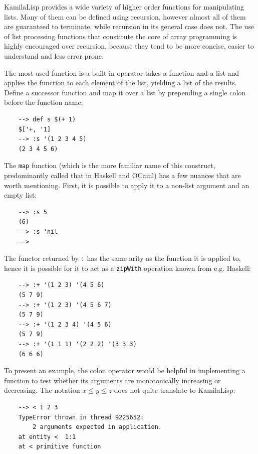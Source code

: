 KamilaLisp provides a wide variety of higher order functions for manipulating lists. Many of them can be defined using recursion, however almost all of them are guaranteed to terminate, while recursion in its general case does not. The use of list processing functions that constitute the core of array programming is highly encouraged over recursion, because they tend to be more concise, easier to understand and less error prone.

The most used function is a built-in operator takes a function and a list and applies the function to each element of the list, yielding a list of the results. Define a successor function and map it over a list by prepending a single colon before the function name:

\begin{Verbatim}
    --> def s $(+ 1)
    $['+, '1]
    --> :s '(1 2 3 4 5)
    (2 3 4 5 6)
\end{Verbatim}

The \verb|map| function (which is the more familiar name of this construct, predominantly called that in Haskell and OCaml) has a few nuances that are worth mentioning. First, it is possible to apply it to a non-list argument and an empty list:

\begin{Verbatim}
    --> :s 5
    (6)
    --> :s 'nil
    -->
\end{Verbatim}

The functor returned by \verb|:| has the same arity as the function it is applied to, hence it is possible for it to act as a \verb|zipWith| operation known from e.g. Haskell:

\begin{Verbatim}
    --> :+ '(1 2 3) '(4 5 6)
    (5 7 9)
    --> :+ '(1 2 3) '(4 5 6 7)
    (5 7 9)
    --> :+ '(1 2 3 4) '(4 5 6)
    (5 7 9)
    --> :+ '(1 1 1) '(2 2 2) '(3 3 3)
    (6 6 6)
\end{Verbatim}

To present an example, the colon operator would be helpful in implementing a function to test whether its arguments are monotonically increasing or decreasing. The notation $x \le y \le z$ does not quite translate to KamilaLisp:

\begin{Verbatim}
    --> < 1 2 3
    TypeError thrown in thread 9225652:
        2 arguments expected in application.
    at entity <  1:1
    at < primitive function
\end{Verbatim}


